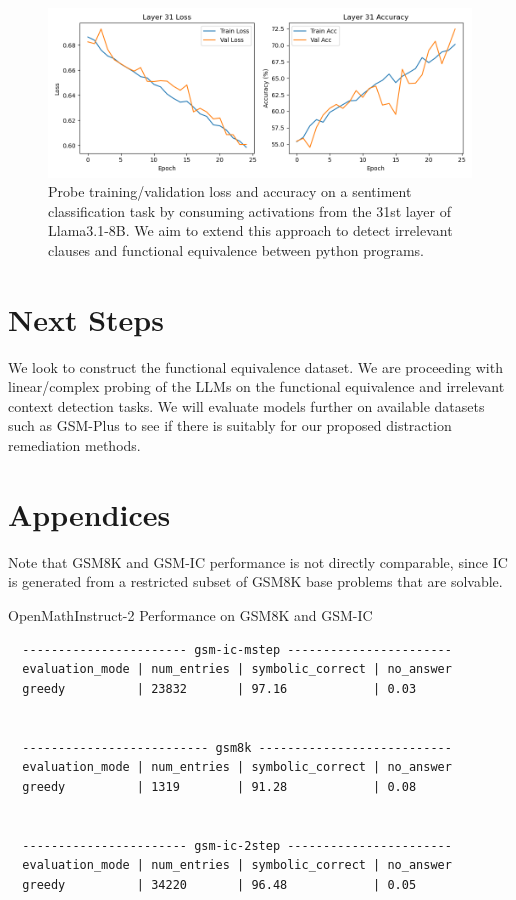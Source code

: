 \documentclass{article}
\begin{document}
\begin{figure}[h!]
    \centering
    \includegraphics[width=\linewidth]{layer_31.png} %
    \caption{Probe training/validation loss and accuracy on a sentiment classification task by consuming activations from the 31st layer of Llama3.1-8B. We aim to extend this approach to detect irrelevant clauses and functional equivalence between python programs.}
    \label{fig:layer31}
\end{figure}

\section{Next Steps}
We look to construct the functional equivalence dataset. We are proceeding with linear/complex probing of the LLMs on the functional equivalence and irrelevant context detection tasks. We will evaluate models further on available datasets such as GSM-Plus to see if there is suitably for our proposed distraction remediation methods.

\section{Appendices} Note that GSM8K and GSM-IC performance is not directly comparable, since IC is generated from a restricted subset of GSM8K base problems that are solvable.

OpenMathInstruct-2 Performance on GSM8K and GSM-IC
\begin{verbatim}
  ----------------------- gsm-ic-mstep -----------------------
  evaluation_mode | num_entries | symbolic_correct | no_answer
  greedy          | 23832       | 97.16            | 0.03     


  -------------------------- gsm8k ---------------------------
  evaluation_mode | num_entries | symbolic_correct | no_answer
  greedy          | 1319        | 91.28            | 0.08     


  ----------------------- gsm-ic-2step -----------------------
  evaluation_mode | num_entries | symbolic_correct | no_answer
  greedy          | 34220       | 96.48            | 0.05  \end{verbatim}
\end{document}
